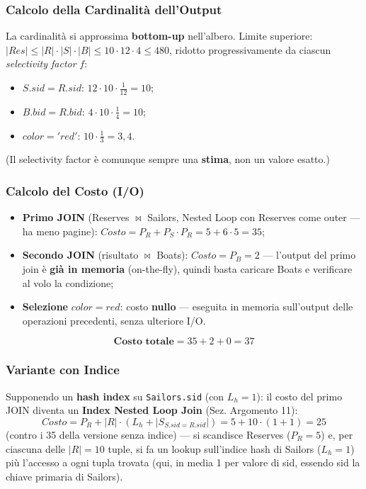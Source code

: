 \documentclass[12pt, a4paper]{article}
\begin{document}
\subsubsection{Calcolo della Cardinalità dell'Output}
La cardinalità si approssima \textbf{bottom-up} nell'albero. Limite superiore: $|Res| \leq |R|\cdot|S|\cdot|B| \leq 10\cdot12\cdot4 \leq 480$, ridotto progressivamente da ciascun \textit{selectivity factor} $f$:
\begin{itemize}
    \item $S.sid{=}R.sid$: $12\cdot10\cdot\frac{1}{12} = 10$;
    \item $B.bid{=}R.bid$: $4\cdot10\cdot\frac{1}{4} = 10$;
    \item $color{=}'red'$: $10\cdot\frac{1}{3} = 3{,}4$.
\end{itemize}
(Il selectivity factor è comunque sempre una \textbf{stima}, non un valore esatto.)

\subsubsection{Calcolo del Costo (I/O)}
\begin{itemize}
    \item \textbf{Primo JOIN} (Reserves $\bowtie$ Sailors, Nested Loop con Reserves come outer — ha meno pagine): $Costo = P_R + P_S\cdot P_R = 5 + 6\cdot5 = 35$;
    \item \textbf{Secondo JOIN} (risultato $\bowtie$ Boats): $Costo = P_B = 2$ — l'output del primo join è \textbf{già in memoria} (on-the-fly), quindi basta caricare Boats e verificare al volo la condizione;
    \item \textbf{Selezione} $color{=}red$: costo \textbf{nullo} — eseguita in memoria sull'output delle operazioni precedenti, senza ulteriore I/O.
\end{itemize}
$$\textbf{Costo totale} = 35+2+0 = 37$$

\subsubsection{Variante con Indice}
Supponendo un \textbf{hash index} su \texttt{Sailors.sid} (con $L_h{=}1$): il costo del primo JOIN diventa un \textbf{Index Nested Loop Join} (Sez. Argomento 11): 
$$Costo = P_R + |R|\cdot(L_h + |S_{S.sid=R.sid}|) = 5+10\cdot(1+1) = 25$$
(contro i 35 della versione senza indice) — si scandisce Reserves ($P_R{=}5$) e, per ciascuna delle $|R|{=}10$ tuple, si fa un lookup sull'indice hash di Sailors ($L_h{=}1$) più l'accesso a ogni tupla trovata (qui, in media 1 per valore di sid, essendo sid la chiave primaria di Sailors).
\end{document}
